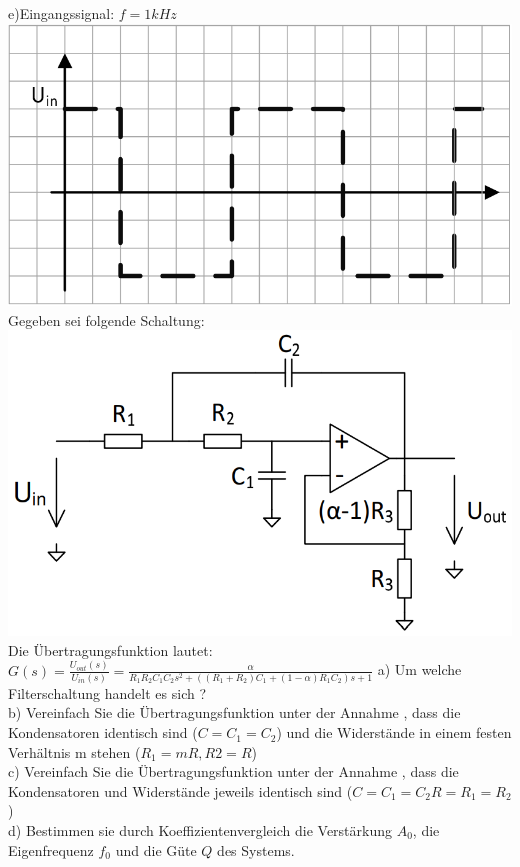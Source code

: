 \documentclass[A4]{scrreprt}
\begin{document}
  e)Eingangssignal: $f=1kHz$\\
  \includegraphics{U_rechteck.png}\\
  Gegeben sei folgende Schaltung:\\
  \includegraphics{Schaltung7.png}\\
  Die Übertragungsfunktion lautet: $G(s) = \frac{U_{out}(s)}{U_{in}(s)} = \frac{\alpha}{R_1R_2C_1C_2s^2+((R_1+R_2)C_1+(1-\alpha)R_1C_2)s+1}$
  a) Um welche Filterschaltung handelt es sich ?\\
  b) Vereinfach Sie die Übertragungsfunktion unter der Annahme , dass die Kondensatoren identisch sind ($C=C_1=C_2$) und die Widerstände in einem festen Verhältnis m stehen ($R_1=mR, R2=R$)\\
  c) Vereinfach Sie die Übertragungsfunktion unter der Annahme , dass die Kondensatoren und Widerstände jeweils identisch sind ($C=C_1=C_2 R=R_1=R_2$)\\
  d) Bestimmen sie durch Koeffizientenvergleich die Verstärkung $A_0$, die Eigenfrequenz $f_0$ und die Güte $Q$ des Systems.\\
\end{document}
